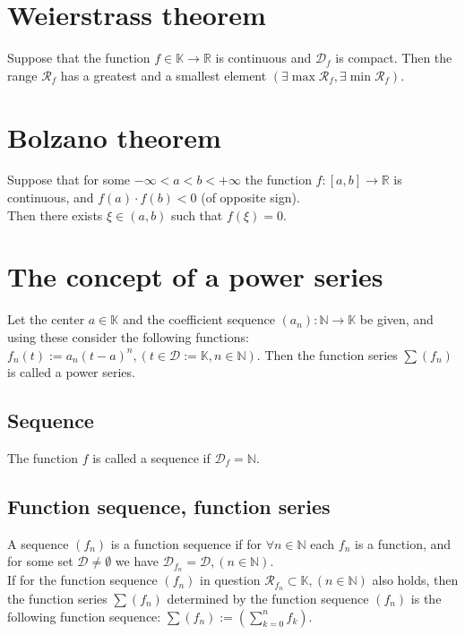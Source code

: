 \documentclass[margin=0px]{article}
\begin{document}
\section{Weierstrass theorem}

Suppose that the function $f \in \mathbb{K} \to \mathbb{R}$ is continuous and $\mathcal{D}_{f}$ is compact. Then the range $\mathcal{R}_{f}$ has a greatest and a smallest element $(\exists \max{\mathcal{R}_{f}}, \exists \min{\mathcal{R}_{f}})$.

\section{Bolzano theorem}

Suppose that for some $-\infty < a < b < +\infty$ the function $f:[a,b] \to \mathbb{R}$ is continuous, and $f(a) \cdot f(b) < 0$ (of opposite sign). \\
Then there exists $\xi \in (a,b)$ such that $f(\xi) = 0$.

\section{The concept of a power series}

Let the center $a \in \mathbb{K}$ and the coefficient sequence $(a_{n}): \mathbb{N} \to \mathbb{K}$ be given, and using these consider the following functions: $f_{n}(t) := a_{n}(t-a)^{n}, (t \in \mathcal{D} := \mathbb{K}, n \in \mathbb{N})$. Then the function series $\sum{(f_{n})}$ is called a power series.

\subsection{Sequence}

The function $f$ is called a sequence if $\mathcal{D}_{f} = \mathbb{N}$.

\subsection{Function sequence, function series}

A sequence $(f_{n})$ is a function sequence if for $\forall n \in \mathbb{N}$ each $f_{n}$ is a function, and for some set $\mathcal{D} \neq \emptyset$ we have $\mathcal{D}_{f_{n}} = \mathcal{D}, (n \in \mathbb{N})$. \\
If for the function sequence $(f_{n})$ in question $\mathcal{R}_{f_{n}} \subset \mathbb{K}, (n \in \mathbb{N})$ also holds, then the function series $\sum{(f_{n})}$ determined by the function sequence $(f_{n})$ is the following function sequence: $\sum{(f_{n})} := (\sum\limits_{k=0}^{n}{f_{k}})$.
\end{document}
